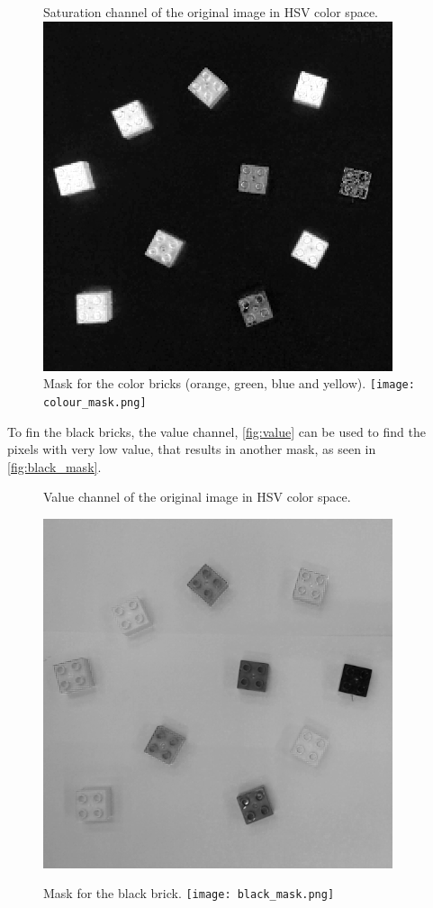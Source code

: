 \begin{figure}[H]
    \captionbox  %
    { 
        Saturation channel of the original image in HSV color space.              
        \label{fig:saturation}                                  
    }                                                                 
    {                                                                  
        \includegraphics[width=.25\textwidth]{figures/saturation.png}         
    }                                                                    
    \hspace{5pt}                                                          
    \captionbox
    {      
        Mask for the color bricks (orange, green, blue and yellow). 
        \label{fig:colour_mask}                                     
    }
    {
        \texttt{[image: colour\_mask.png]}            
    }                                                                             
\end{figure}

To fin the black bricks, the value channel, \autoref{fig:value} can be used to find the pixels with very low value, that results in another mask, as seen in \autoref{fig:black_mask}.

\begin{figure}[H]
    \captionbox  %
    {
        Value channel of the original image in HSV color space.                
        \label{fig:value}                                  
    }                                                                 
    {       
                                                                    
        \includegraphics[width=.25\textwidth]{figures/value.png}         
    }                                                                    
    \hspace{5pt}                                                          
    \captionbox
    {  
        Mask for the black brick.
        \label{fig:black_mask}                                     
    }
    {
        \texttt{[image: black\_mask.png]}            
    }                                                                             
\end{figure}

